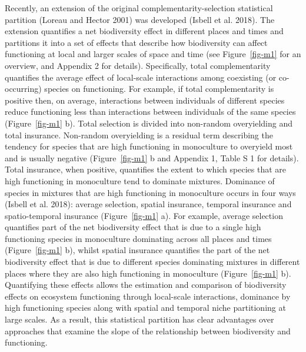 \documentclass[
  letterpaper,
  DIV=11,
  numbers=noendperiod]{scrartcl}
\begin{document}
Recently, an extension of the original complementarity-selection
statistical partition (Loreau and Hector 2001) was developed (Isbell et
al. 2018). The extension quantifies a net biodiversity effect in
different places and times and partitions it into a set of effects that
describe how biodiversity can affect functioning at local and larger
scales of space and time (see Figure~\ref{fig-m1} for an overview, and
Appendix 2 for details). Specifically, total complementarity quantifies
the average effect of local-scale interactions among coexisting (or
co-occurring) species on functioning. For example, if total
complementarity is positive then, on average, interactions between
individuals of different species reduce functioning less than
interactions between individuals of the same species
(Figure~\ref{fig-m1} b). Total selection is divided into non-random
overyielding and total insurance. Non-random overyielding is a residual
term describing the tendency for species that are high functioning in
monoculture to overyield most and is usually negative
(Figure~\ref{fig-m1} b and Appendix 1, Table S 1 for details). Total
insurance, when positive, quantifies the extent to which species that
are high functioning in monoculture tend to dominate mixtures. Dominance
of species in mixtures that are high functioning in monoculture occurs
in four ways (Isbell et al. 2018): average selection, spatial insurance,
temporal insurance and spatio-temporal insurance (Figure~\ref{fig-m1}
a). For example, average selection quantifies part of the net
biodiversity effect that is due to a single high functioning species in
monoculture dominating across all places and times (Figure~\ref{fig-m1}
b), whilst spatial insurance quantifies the part of the net biodiversity
effect that is due to different species dominating mixtures in different
places where they are also high functioning in monoculture
(Figure~\ref{fig-m1} b). Quantifying these effects allows the estimation
and comparison of biodiversity effects on ecosystem functioning through
local-scale interactions, dominance by high functioning species along
with spatial and temporal niche partitioning at large scales. As a
result, this statistical partition has clear advantages over approaches
that examine the slope of the relationship between biodiversity and
functioning.
\end{document}
